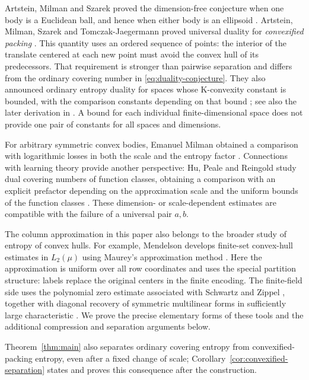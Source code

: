 Artstein, Milman and Szarek proved the dimension-free conjecture when
one body is a Euclidean ball, and hence when either body is an ellipsoid
\cite[Theorem~1]{AMS2004}. Artstein, Milman, Szarek and
Tomczak-Jaegermann proved universal duality for \emph{convexified packing}
\cite[Theorem~2]{AMSTJ2004}. This quantity uses an ordered sequence of
points: the interior of the translate centered at each new point must
avoid the convex hull of its predecessors. That requirement is stronger
than pairwise separation and differs from the ordinary covering number
in \eqref{eq:duality-conjecture}. They also announced ordinary entropy
duality for spaces whose K-convexity constant is bounded, with the
comparison constants depending on that bound
\cite[Theorem~5]{AMSTJ2004}; see also the later derivation in
\cite[Section~2]{Milman2007}. A bound for each individual
finite-dimensional space does not provide one pair of constants for
all spaces and dimensions.

For arbitrary symmetric convex bodies, Emanuel Milman obtained a
comparison with logarithmic losses in both the scale and the entropy
factor \cite[Corollary~1.2]{Milman2007}. Connections with learning theory
provide another perspective: Hu, Peale and Reingold study dual covering
numbers of function classes, obtaining a comparison with an explicit
prefactor depending on the approximation scale and the uniform bounds
of the function classes \cite[Theorem~11]{HuPealeReingold2022}.
These dimension- or scale-dependent estimates are compatible with the
failure of a universal pair $a,b$.

The column approximation in this paper also belongs to the broader
study of entropy of convex hulls. For example, Mendelson develops
finite-set convex-hull estimates in $L_2(\mu)$ using Maurey's
approximation method
\cite[Section~2.1]{Mendelson2001}. Here the approximation is uniform over
all row coordinates and uses the special partition structure: labels
replace the original centers in the finite encoding. The finite-field
side uses the polynomial zero estimate associated with Schwartz and
Zippel \cite{Schwartz1980,Zippel1979}, together with diagonal recovery
of symmetric multilinear forms in sufficiently large characteristic
\cite{FerreroMicali1979,DrapalVojtechovsky2009}. We prove the precise
elementary forms of these tools and the additional compression and
separation arguments below.

Theorem~\ref{thm:main} also separates ordinary covering entropy from
convexified-packing entropy, even after a fixed change of scale;
Corollary~\ref{cor:convexified-separation} states and proves this
consequence after the construction.

